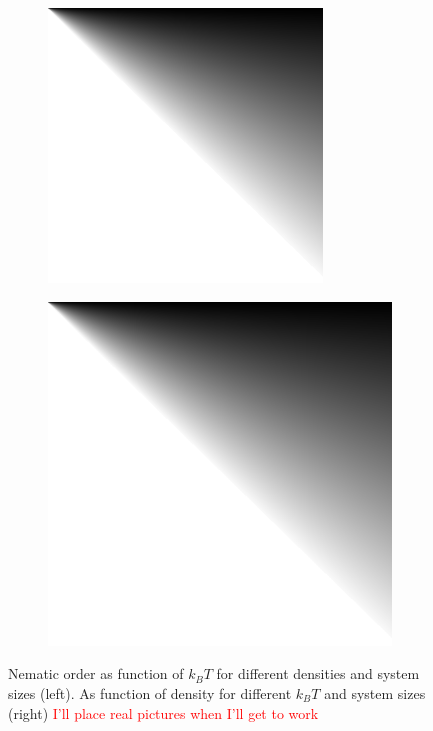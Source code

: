 \documentclass[12pt, a4paper]{article}
\begin{document}
\begin{figure}
 \centering
 \begin{subfigure}{.45\textwidth}
  \centering
  \includegraphics[width=0.8\textwidth]{Images/dummy.png}
 \end{subfigure}
 \begin{subfigure}{.45\textwidth}
  \centering
  \includegraphics[width=.8\textwidth]{Images/dummy.png}
 \end{subfigure}
 \captionsetup{justification=centering, width=0.9\columnwidth}
 \caption{Nematic order as function of $k_BT$ for different densities and system sizes (left). As function of density for different $k_BT$ and system sizes (right) \textcolor{red}{I'll place real pictures when I'll get to work}}
 \label{fig:equilibrium_order_parameter}
\end{figure}
\end{document}
